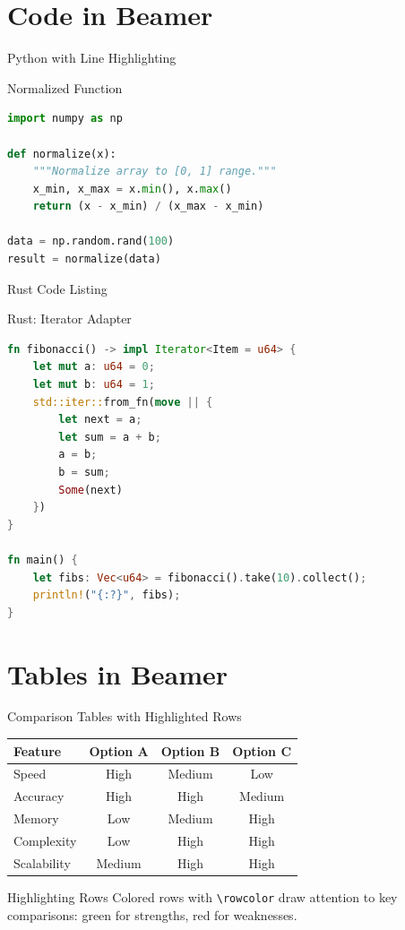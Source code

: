 \documentclass[doctype=beamer, beameraspectratio=169, beamertheme=Madrid, institution=generic]{omnilatex}
\begin{document}
\section{Code in Beamer}
\begin{frame}[fragile]{Python with Line Highlighting}
  \begin{block}{Normalized Function}
    \begin{lstlisting}[language=Python, highlightlines={3-5}]
import numpy as np

def normalize(x):
    """Normalize array to [0, 1] range."""
    x_min, x_max = x.min(), x.max()
    return (x - x_min) / (x_max - x_min)

data = np.random.rand(100)
result = normalize(data)
    \end{lstlisting}
  \end{block}
\end{frame}
\begin{frame}[fragile]{Rust Code Listing}
  \begin{block}{Rust: Iterator Adapter}
    \begin{lstlisting}[language=Rust]
fn fibonacci() -> impl Iterator<Item = u64> {
    let mut a: u64 = 0;
    let mut b: u64 = 1;
    std::iter::from_fn(move || {
        let next = a;
        let sum = a + b;
        a = b;
        b = sum;
        Some(next)
    })
}

fn main() {
    let fibs: Vec<u64> = fibonacci().take(10).collect();
    println!("{:?}", fibs);
}
    \end{lstlisting}
  \end{block}
\end{frame}
\section{Tables in Beamer}
\begin{frame}{Comparison Tables with Highlighted Rows}
  \begin{center}
    \begin{tabular}{l c c c}
      \toprule
      \textbf{Feature} & \textbf{Option A} & \textbf{Option B} & \textbf{Option C} \\
      \midrule
      Speed       & High  & Medium & Low  \\
      \rowcolor{green!10} Accuracy  & High  & High   & Medium \\
      Memory      & Low   & Medium & High \\
      \rowcolor{red!10} Complexity & Low   & High   & High   \\
      Scalability & Medium & High  & High \\
      \bottomrule
    \end{tabular}
  \end{center}
  \vspace{1em}
  \begin{exampleblock}{Highlighting Rows}
    Colored rows with \texttt{\textbackslash rowcolor} draw attention to
    key comparisons: green for strengths, red for weaknesses.
  \end{exampleblock}
\end{frame}
\end{document}
